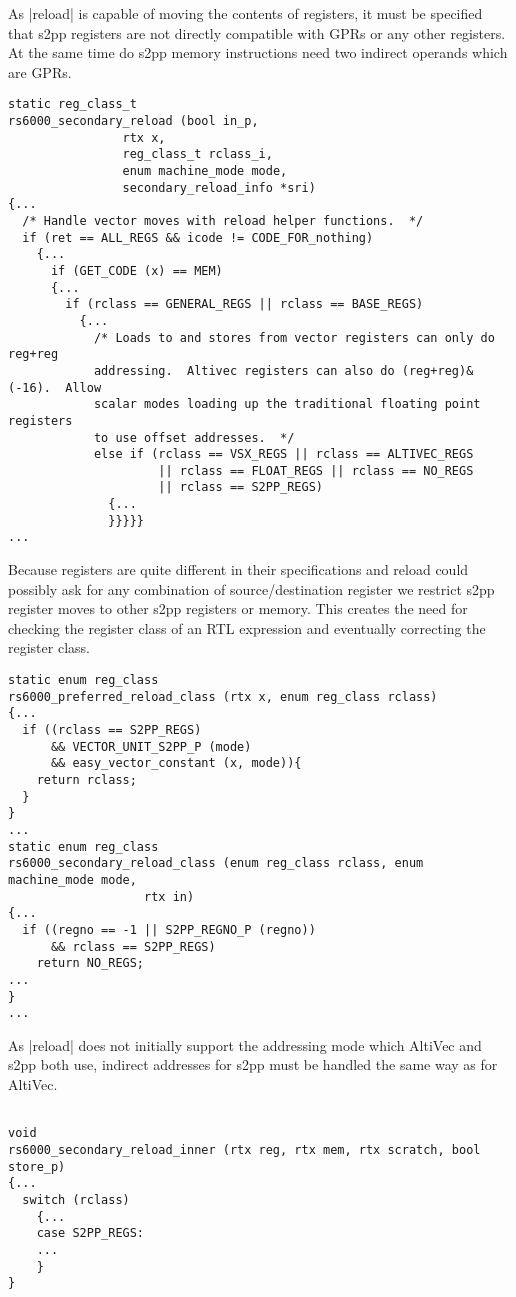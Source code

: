 As |reload| is capable of moving the contents of registers, it must be specified that s2pp registers are not directly compatible with GPRs or any other registers.
At the same time do \ac{s2pp} memory instructions need two indirect operands which are \acp{GPR}.
\begin{lstlisting}
static reg_class_t
rs6000_secondary_reload (bool in_p,
                rtx x,
                reg_class_t rclass_i,
                enum machine_mode mode,
                secondary_reload_info *sri)
{...
  /* Handle vector moves with reload helper functions.  */
  if (ret == ALL_REGS && icode != CODE_FOR_nothing)
    {...
      if (GET_CODE (x) == MEM)
      {...
        if (rclass == GENERAL_REGS || rclass == BASE_REGS)
          {...
            /* Loads to and stores from vector registers can only do reg+reg
            addressing.  Altivec registers can also do (reg+reg)&(-16).  Allow
            scalar modes loading up the traditional floating point registers
            to use offset addresses.  */
            else if (rclass == VSX_REGS || rclass == ALTIVEC_REGS
                     || rclass == FLOAT_REGS || rclass == NO_REGS
                     || rclass == S2PP_REGS)
              {...
              }}}}}
...
\end{lstlisting}

Because registers are quite different in their specifications and reload could possibly ask for any combination of source/destination register we restrict s2pp register moves to other s2pp registers or memory.
This creates the need for checking the register class of an \ac{RTL} expression and eventually correcting the register class.
\begin{lstlisting}
static enum reg_class
rs6000_preferred_reload_class (rtx x, enum reg_class rclass)
{...
  if ((rclass == S2PP_REGS)
      && VECTOR_UNIT_S2PP_P (mode)
      && easy_vector_constant (x, mode)){
    return rclass;
  }
}
...
static enum reg_class
rs6000_secondary_reload_class (enum reg_class rclass, enum machine_mode mode,
                   rtx in)
{...
  if ((regno == -1 || S2PP_REGNO_P (regno))
      && rclass == S2PP_REGS)
    return NO_REGS;
...
}
...
\end{lstlisting}

As |reload| does not initially support the addressing mode which AltiVec and s2pp both use, indirect addresses for s2pp must be handled the same way as for AltiVec.
\begin{lstlisting}

void
rs6000_secondary_reload_inner (rtx reg, rtx mem, rtx scratch, bool store_p)
{...
  switch (rclass)
    {...
    case S2PP_REGS:
    ...
    }
}
\end{lstlisting}

